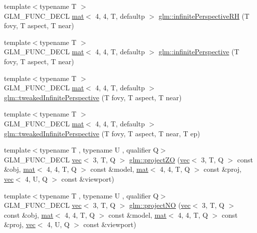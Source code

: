 \begin{DoxyCompactItemize}
\item 
{\footnotesize template$<$typename T $>$ }\\G\+L\+M\+\_\+\+F\+U\+N\+C\+\_\+\+D\+E\+CL \hyperlink{structglm_1_1mat}{mat}$<$ 4, 4, T, defaultp $>$ \hyperlink{group__gtc__matrix__transform_ga99672ffe5714ef478dab2437255fe7e1}{glm\+::infinite\+Perspective\+RH} (T fovy, T aspect, T near)
\item 
{\footnotesize template$<$typename T $>$ }\\G\+L\+M\+\_\+\+F\+U\+N\+C\+\_\+\+D\+E\+CL \hyperlink{structglm_1_1mat}{mat}$<$ 4, 4, T, defaultp $>$ \hyperlink{group__gtc__matrix__transform_ga44fa38a18349450325cae2661bb115ca}{glm\+::infinite\+Perspective} (T fovy, T aspect, T near)
\item 
{\footnotesize template$<$typename T $>$ }\\G\+L\+M\+\_\+\+F\+U\+N\+C\+\_\+\+D\+E\+CL \hyperlink{structglm_1_1mat}{mat}$<$ 4, 4, T, defaultp $>$ \hyperlink{group__gtc__matrix__transform_gaaeacc04a2a6f4b18c5899d37e7bb3ef9}{glm\+::tweaked\+Infinite\+Perspective} (T fovy, T aspect, T near)
\item 
{\footnotesize template$<$typename T $>$ }\\G\+L\+M\+\_\+\+F\+U\+N\+C\+\_\+\+D\+E\+CL \hyperlink{structglm_1_1mat}{mat}$<$ 4, 4, T, defaultp $>$ \hyperlink{group__gtc__matrix__transform_gaf5b3c85ff6737030a1d2214474ffa7a8}{glm\+::tweaked\+Infinite\+Perspective} (T fovy, T aspect, T near, T ep)
\item 
{\footnotesize template$<$typename T , typename U , qualifier Q$>$ }\\G\+L\+M\+\_\+\+F\+U\+N\+C\+\_\+\+D\+E\+CL \hyperlink{structglm_1_1vec}{vec}$<$ 3, T, Q $>$ \hyperlink{group__gtc__matrix__transform_ga77d157525063dec83a557186873ee080}{glm\+::project\+ZO} (\hyperlink{structglm_1_1vec}{vec}$<$ 3, T, Q $>$ const \&obj, \hyperlink{structglm_1_1mat}{mat}$<$ 4, 4, T, Q $>$ const \&model, \hyperlink{structglm_1_1mat}{mat}$<$ 4, 4, T, Q $>$ const \&proj, \hyperlink{structglm_1_1vec}{vec}$<$ 4, U, Q $>$ const \&viewport)
\item 
{\footnotesize template$<$typename T , typename U , qualifier Q$>$ }\\G\+L\+M\+\_\+\+F\+U\+N\+C\+\_\+\+D\+E\+CL \hyperlink{structglm_1_1vec}{vec}$<$ 3, T, Q $>$ \hyperlink{group__gtc__matrix__transform_ga05249751f48d14cb282e4979802b8111}{glm\+::project\+NO} (\hyperlink{structglm_1_1vec}{vec}$<$ 3, T, Q $>$ const \&obj, \hyperlink{structglm_1_1mat}{mat}$<$ 4, 4, T, Q $>$ const \&model, \hyperlink{structglm_1_1mat}{mat}$<$ 4, 4, T, Q $>$ const \&proj, \hyperlink{structglm_1_1vec}{vec}$<$ 4, U, Q $>$ const \&viewport)

\end{DoxyCompactItemize}
